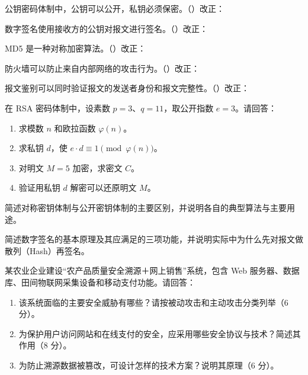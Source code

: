 \documentclass[a4paper,11pt]{article}
\begin{document}
\q 公钥密码体制中，公钥可以公开，私钥必须保密。\quad（\quad）\quad 改正：\fixblank

\q 数字签名使用接收方的公钥对报文进行签名。\quad（\quad）\quad 改正：\fixblank

\q MD5 是一种对称加密算法。\quad（\quad）\quad 改正：\fixblank

\q 防火墙可以防止来自内部网络的攻击行为。\quad（\quad）\quad 改正：\fixblank

\q 报文鉴别可以同时验证报文的发送者身份和报文完整性。\quad（\quad）\quad 改正：\fixblank

\q 在 RSA 密码体制中，设素数 $p=3$、$q=11$，取公开指数 $e=3$。请回答：
\begin{enumerate}[leftmargin=2em, itemsep=1pt, topsep=2pt]
  \item 求模数 $n$ 和欧拉函数 $\varphi(n)$。
  \item 求私钥 $d$，使 $e\cdot d\equiv 1\pmod{\varphi(n)}$。
  \item 对明文 $M=5$ 加密，求密文 $C$。
  \item 验证用私钥 $d$ 解密可以还原明文 $M$。
\end{enumerate}
\anslines{5cm}

\newpage
{}
\q 简述对称密钥体制与公开密钥体制的主要区别，并说明各自的典型算法与主要用途。\anslines{5cm}

\q 简述数字签名的基本原理及其应满足的三项功能，并说明实际中为什么先对报文做散列（Hash）再签名。\anslines{5cm}

\q 某农业企业建设“农产品质量安全溯源＋网上销售”系统，包含 Web 服务器、数据库、田间物联网采集设备和移动支付功能。请回答：
\begin{enumerate}[leftmargin=2em, itemsep=1pt, topsep=2pt]
  \item 该系统面临的主要安全威胁有哪些？请按被动攻击和主动攻击分类列举（6 分）。
  \item 为保护用户访问网站和在线支付的安全，应采用哪些安全协议与技术？简述其作用（8 分）。
  \item 为防止溯源数据被篡改，可设计怎样的技术方案？说明其原理（6 分）。
\end{enumerate}
\anslines{8cm}
\end{document}
